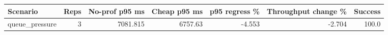 \begin{tabular}{lrrrrrr}
\hline
Scenario & Reps & No-prof p95 ms & Cheap p95 ms & p95 regress \% & Throughput change \% & Success \\
\hline
queue_pressure & 3 & 7081.815 & 6757.63 & -4.553 & -2.704 & 100.0 \\
\hline
\end{tabular}
